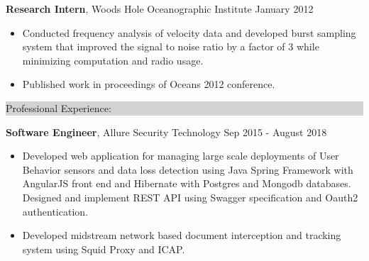 \documentclass{article} %
\newcommand{\rsection}[1]{
  \hspace{-0.4cm}\vspace{0.1cm}
\colorbox{lightgrey}{
\begin{minipage}{1.07\linewidth}
\vspace{0.22cm}
\fontsize{14pt}{16pt}\selectfont #1
\vspace{0.12cm}
\end{minipage}
}
\vspace*{-0.1cm}
}
\newcommand{\rjob}[2]{
  \hspace*{-0.3cm}
{\fontsize{10pt}{12pt}\selectfont #1} \hfill #2
\vspace*{0.1cm}
\hspace*{-1.2cm}
}
\newenvironment{ritemize}{
\hspace*{-0.8cm}
\begin{minipage}{1.05\linewidth}
\begin{itemize}
}{
\end{itemize}
\end{minipage}
}
\newcommand{\ritem}{
\item[-]
}
\begin{document}


\rjob{\textbf{Research Intern}, Woods Hole Oceanographic Institute}{January 2012}\\
\begin{ritemize}
\ritem Conducted frequency analysis of velocity data and developed burst sampling system that improved the signal to noise ratio by a factor of 3 while minimizing computation and radio usage.
\ritem Published work in proceedings of Oceans 2012 conference.
\end{ritemize}

\vspace{0.2cm}
\rsection{Professional Experience:}

\rjob{\textbf{Software Engineer}, Allure Security Technology}{Sep 2015 - August 2018}\\
\begin{ritemize}
\ritem Developed web application for managing large scale deployments of User Behavior sensors and data loss detection using Java Spring Framework with AngularJS front end and Hibernate with Postgres and Mongodb databases. Designed and implement REST API using Swagger specification and Oauth2 authentication.
\ritem Developed midstream network based document interception and tracking system using Squid Proxy and ICAP.
\end{ritemize}
\end{document}
